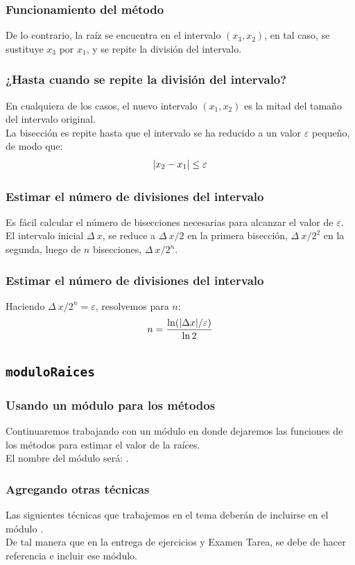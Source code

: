 \documentclass[12pt]{beamer}
\begin{document}
\begin{frame}
\frametitle{Funcionamiento del método}
De lo contrario, la raíz se encuentra en el intervalo $(x_{3}, x_{2})$, en tal caso, se sustituye $x_{3}$ por $x_{1}$, y se repite la división del intervalo.
\end{frame}
\begin{frame}
\frametitle{¿Hasta cuando se repite la división del intervalo?}
En cualquiera de los casos, el nuevo intervalo $(x_{1}, x_{2})$ es la mitad del tamaño del intervalo original.
\\
\bigskip
\pause
La bisección es repite hasta que el intervalo se ha reducido a un valor $\varepsilon$ pequeño, de modo que:
\begin{align*}
\abs{ x_{2} - x_{1} } \leq \varepsilon
\end{align*}
\end{frame}
\begin{frame}
\frametitle{Estimar el número de divisiones del intervalo}
Es fácil calcular el número de bisecciones necesarias para alcanzar el valor de $\varepsilon$.
\\
\bigskip
\pause
El intervalo inicial $\Delta \: x$, se reduce a $\Delta \: x /2$ en la primera bisección, $\Delta \: x /2^{2}$ en la segunda, luego de $n$ bisecciones, $\Delta \: x /2^{n}$.
\end{frame}
\begin{frame}
\frametitle{Estimar el número de divisiones del intervalo}
Haciendo $\Delta \: x /2^{n} = \varepsilon$, resolvemos para $n$:
\pause
\begin{align*}
n = \dfrac{\ln( \abs{ \Delta x } / \varepsilon)}{\ln 2}
\end{align*}
\end{frame}

\subsection{\texttt{moduloRaices}}

\begin{frame}
\frametitle{Usando un módulo para los métodos}
Continuaremos trabajando con un módulo en donde dejaremos las funciones de los métodos para estimar el valor de la raíces.
\\
\bigskip
\pause
El nombre del módulo será: .
\end{frame}
\begin{frame}
\frametitle{Agregando otras técnicas}
Las siguientes técnicas que trabajemos en el tema deberán de incluirse en el módulo .
\\
\bigskip
\pause
De tal manera que en la entrega de ejercicios y Examen Tarea, se debe de hacer referencia e incluir ese módulo.
\end{frame}
\end{document}
